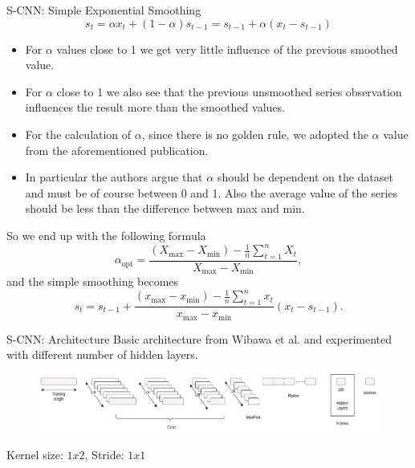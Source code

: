 \documentclass[aspectratio=169, 12pt]{beamer}
\begin{document}
\begin{frame}[allowframebreaks]{S-CNN: Simple Exponential Smoothing}
  \begin{equation*}
    \displaystyle s_{t}=\alpha x_{t}+(1-\alpha )s_{t-1}=s_{t-1}+\alpha (x_{t}-s_{t-1})
  \end{equation*}
    \begin{itemize}
        \item For $\alpha$ values close to 1 we get very little influence of the previous smoothed value.
        \item For $\alpha$ close to 1 we also see that the previous unsmoothed series observation influences the result more than the smoothed values.
        \item For the calculation of $\alpha$, since there is no golden rule, we adopted the $\alpha$ value from the aforementioned publication.
        \item In particular the authors argue that $\alpha$ should be dependent on the dataset and must be of course between 0 and 1. Also the average value of the series should be less than the difference between max and min.
    \end{itemize}
So we end up with the following formula
\begin{equation*}
\alpha_{\text{opt}} = \frac{\left( X_{\text{max}} - X_{\text{min}} \right) - \frac{1}{n} \sum_{t=1}^{n} X_t}{X_{\text{max}} - X_{\text{min}}},
\end{equation*}
and the simple smoothing becomes
\begin{equation*}
s_t = s_{t-1} + \frac{\left( x_{\text{max}} - x_{\text{min}} \right) - \frac{1}{n} \sum_{t=1}^{n} x_t}{x_{\text{max}} - x_{\text{min}}} \left( x_t - s_{t-1} \right) .
\end{equation*}
\end{frame}

\begin{frame}{S-CNN: Architecture}
Basic architecture from Wibawa et al.\cite{e-cnn} and experimented with different number of hidden layers.
\begin{figure}[htbp]
\centering
\includegraphics[width=\columnwidth]{./plots/s-cnn.jpg}
\end{figure}
\begin{center}
    Kernel size: $1x2$, Stride: $1x1$
\end{center}
\end{frame}
\end{document}
